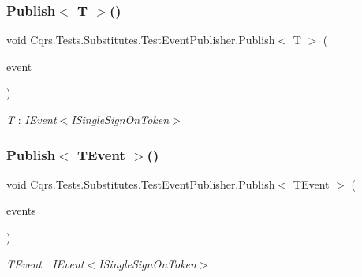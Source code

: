 \subsubsection{\texorpdfstring{Publish$<$ T $>$()}{Publish< T >()}}
{\footnotesize\ttfamily void Cqrs.\+Tests.\+Substitutes.\+Test\+Event\+Publisher.\+Publish$<$ T $>$ (\begin{DoxyParamCaption}\item[{T @}]{event }\end{DoxyParamCaption})}

\begin{Desc}
\item[Type Constraints]\begin{description}
\item[{\em T} : {\em I\+Event$<$I\+Single\+Sign\+On\+Token$>$}]\end{description}
\end{Desc}
\mbox{\label{classCqrs_1_1Tests_1_1Substitutes_1_1TestEventPublisher_adbfefbd0acaa4f7a89344f54871f3943_adbfefbd0acaa4f7a89344f54871f3943}} 
\subsubsection{\texorpdfstring{Publish$<$ T\+Event $>$()}{Publish< TEvent >()}}
{\footnotesize\ttfamily void Cqrs.\+Tests.\+Substitutes.\+Test\+Event\+Publisher.\+Publish$<$ T\+Event $>$ (\begin{DoxyParamCaption}\item[{I\+Enumerable$<$ T\+Event $>$}]{events }\end{DoxyParamCaption})}

\begin{Desc}
\item[Type Constraints]\begin{description}
\item[{\em T\+Event} : {\em I\+Event$<$I\+Single\+Sign\+On\+Token$>$}]\end{description}
\end{Desc}


